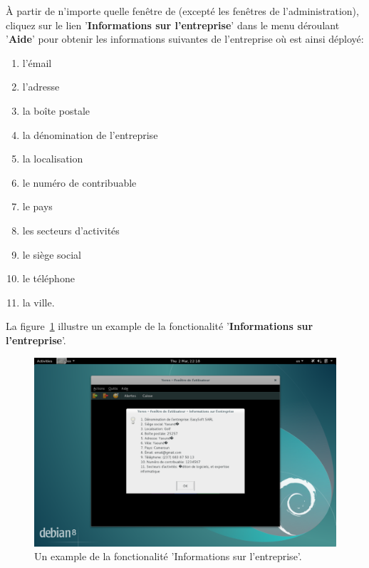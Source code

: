 

\`A partir de n'importe quelle fen\^etre de \yeren (except\'e
les fen\^etres de l'administration), cliquez
sur le lien '\textbf{Informations sur l'entreprise}' dans
le menu d\'eroulant '\textbf{Aide}' pour obtenir les
informations suivantes de l'entreprise o\`u \yeren
est ainsi d\'eploy\'e:

\begin{enumerate}[1)]
	\item l'\'email
	\item l'adresse
	\item la bo\^ite postale
	\item la d\'enomination de l'entreprise
	\item la localisation
	\item le num\'ero de contribuable	
	\item le pays
	\item les secteurs d'activit\'es
	\item le si\`ege social
	\item le t\'el\'ephone
	\item la ville.
\end{enumerate}

La figure~\ref{fig:yeren-informations-generales-entreprise}
illustre un example de la fonctionalit\'e 
'\textbf{Informations sur l'entreprise}'.\\

\begin{figure}[!htbp]
	\centering
	\includegraphics[scale=0.4]{images/yeren-informations-generales-entreprise.png}
	\caption{Un example de la fonctionalit\'e 'Informations sur l'entreprise'.}
	\label{fig:yeren-informations-generales-entreprise}
\end{figure}

